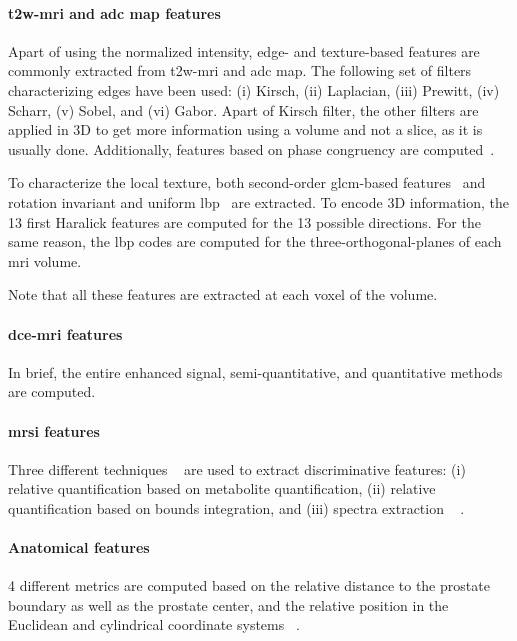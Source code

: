 \paragraph{\ac{t2w}-\ac{mri} and \ac{adc} map features}
Apart of using the normalized intensity, edge- and texture-based features are commonly extracted from \ac{t2w}-\ac{mri} and \ac{adc} map.
The following set of filters characterizing edges have been used: (i) Kirsch, (ii) Laplacian, (iii) Prewitt, (iv) Scharr, (v) Sobel, and (vi) Gabor.
Apart of Kirsch filter, the other filters are applied in 3D to get more information using a volume and not a slice, as it is usually done.
Additionally, features based on phase congruency are computed~\cite{kovesi1999image}.

To characterize the local texture, both second-order \ac{glcm}-based features~\cite{Haralick1973} and rotation invariant and uniform \ac{lbp}~\cite{ojala2002multiresolution} are extracted.
To encode 3D information, the 13 first Haralick features are computed for the 13 possible directions.
For the same reason, the \ac{lbp} codes are computed for the three-orthogonal-planes of each \ac{mri} volume.

Note that all these features are extracted at each voxel of the volume.

\paragraph{\ac{dce}-\ac{mri} features} 
In brief, the entire enhanced signal, semi-quantitative, and quantitative methods are computed. 
\paragraph{\ac{mrsi} features} 
Three different techniques ~\cite{Parfait2012} are used to extract discriminative features: (i) relative quantification based on metabolite quantification, (ii) relative quantification based on bounds integration, and (iii) spectra extraction ~\cite{Lemaitre2016thesis} .

\paragraph{Anatomical features}

4 different metrics are computed based on the relative distance to the prostate boundary as well as the prostate center, and the relative position in the Euclidean and cylindrical coordinate systems ~\cite{Chen2002,Litjens2014}.

